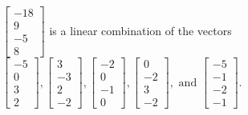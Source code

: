 \begin{exercise}
\begin{exerciseStatement}
  \end{exerciseStatement}
  \begin{exerciseAnswer}
   \(\left[\begin{array}{c}
-18 \\
9 \\
-5 \\
8
\end{array}\right]\) 
  	 is  
	a linear combination of the vectors \(\left[\begin{array}{c}
-5 \\
0 \\
3 \\
2
\end{array}\right] , \left[\begin{array}{c}
3 \\
-3 \\
2 \\
-2
\end{array}\right] , \left[\begin{array}{c}
-2 \\
0 \\
-1 \\
0
\end{array}\right] , \left[\begin{array}{c}
0 \\
-2 \\
3 \\
-2
\end{array}\right] , \text{ and } \left[\begin{array}{c}
-5 \\
-1 \\
-2 \\
-1
\end{array}\right]\).

	
  


  \end{exerciseAnswer}
\end{exercise}